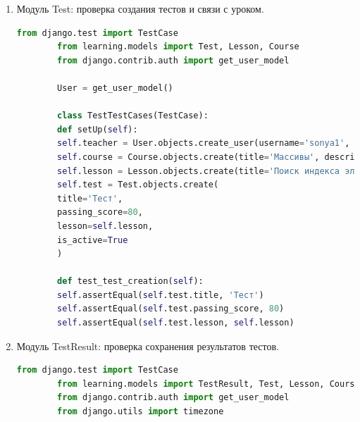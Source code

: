 \begin{enumerate}
\begin{lstlisting}[language=Python, caption=Модульный тест для Lesson, label=lst:lesson_test]
		User = get_user_model()
		
		class LessonTestCases(TestCase):
		def setUp(self):
		self.teacher = User.objects.create_user(username='sonya1', password='vanya232323', is_teacher=True)
		self.course = Course.objects.create(title='Массивы', description='Описание курса', creator=self.teacher)
		self.lesson = Lesson.objects.create(
		title='Что такое массивы',
		content='Содержимое урока',
		order=1,
		course=self.course,
		is_published=True
		)
		
		def test_lesson_creation(self):
		self.assertEqual(self.lesson.title, 'Что такое массивы')
		self.assertEqual(self.lesson.order, 1)
		self.assertEqual(self.lesson.course, self.course)
	\end{lstlisting}
	
	\item Модуль Test: проверка создания тестов и связи с уроком.
	\begin{lstlisting}[language=Python, caption=Модульный тест для Test, label=lst:test_test]
		from django.test import TestCase
		from learning.models import Test, Lesson, Course
		from django.contrib.auth import get_user_model
		
		User = get_user_model()
		
		class TestTestCases(TestCase):
		def setUp(self):
		self.teacher = User.objects.create_user(username='sonya1', password='vanya232323', is_teacher=True)
		self.course = Course.objects.create(title='Массивы', description='Описание курса', creator=self.teacher)
		self.lesson = Lesson.objects.create(title='Поиск индекса элемента в массиве', content='Содержимое урока', order=1, course=self.course)
		self.test = Test.objects.create(
		title='Тест',
		passing_score=80,
		lesson=self.lesson,
		is_active=True
		)
		
		def test_test_creation(self):
		self.assertEqual(self.test.title, 'Тест')
		self.assertEqual(self.test.passing_score, 80)
		self.assertEqual(self.test.lesson, self.lesson)
	\end{lstlisting}
	
	\item Модуль TestResult: проверка сохранения результатов тестов.
	\begin{lstlisting}[language=Python, caption=Модульный тест для TestResult, label=lst:testresult_test]
		from django.test import TestCase
		from learning.models import TestResult, Test, Lesson, Course
		from django.contrib.auth import get_user_model
		from django.utils import timezone
		

\end{lstlisting}
\end{enumerate}
